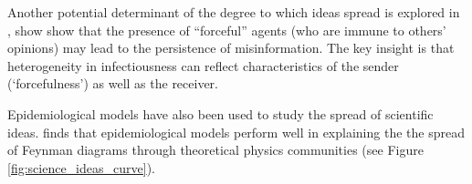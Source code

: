 Another potential determinant of the degree to which ideas spread is explored in \href{https://www.kdd.org/exploration_files/8._CR.10.Misinformation_in_social_media_-_Final.pdf}{\cite{acemoglu2010spread}}, show show that the presence of ``forceful'' agents (who are immune to others' opinions) may lead to the persistence of misinformation. The key insight is that heterogeneity in infectiousness can reflect characteristics of the sender (`forcefulness') as well as the receiver.

Epidemiological models have also been used to study the spread of scientific ideas.   \href{https://github.com/iworld1991/EpiExp/blob/master/Literature/bettencourt2006power.pdf}{\cite{bettencourt2006power}} finds that epidemiological models perform well in explaining the the spread of Feynman diagrams through theoretical physics communities (see Figure \ref{fig:science_ideas_curve}). 


